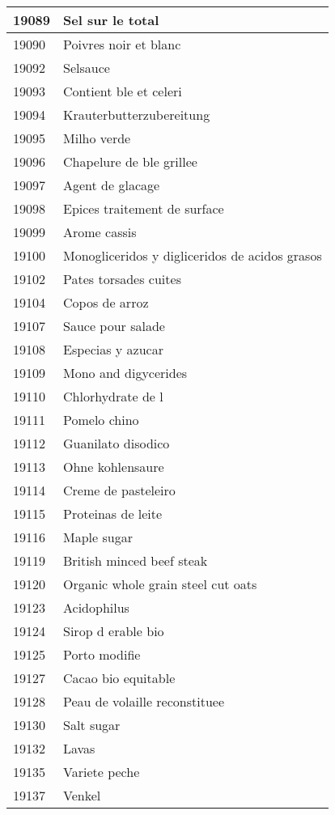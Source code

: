 \begin{longtable}{|l|l|}
19089 & Sel sur le total \\ \hline 
19090 & Poivres noir et blanc \\ \hline 
19092 & Selsauce \\ \hline 
19093 & Contient ble et celeri \\ \hline 
19094 & Krauterbutterzubereitung \\ \hline 
19095 & Milho verde \\ \hline 
19096 & Chapelure de ble grillee \\ \hline 
19097 & Agent de glacage \\ \hline 
19098 & Epices traitement de surface \\ \hline 
19099 & Arome cassis \\ \hline 
19100 & Monogliceridos y digliceridos de acidos grasos \\ \hline 
19102 & Pates torsades cuites \\ \hline 
19104 & Copos de arroz \\ \hline 
19107 & Sauce pour salade \\ \hline 
19108 & Especias y azucar \\ \hline 
19109 & Mono and digycerides \\ \hline 
19110 & Chlorhydrate de l \\ \hline 
19111 & Pomelo chino \\ \hline 
19112 & Guanilato disodico \\ \hline 
19113 & Ohne kohlensaure \\ \hline 
19114 & Creme de pasteleiro \\ \hline 
19115 & Proteinas de leite \\ \hline 
19116 & Maple sugar \\ \hline 
19119 & British minced beef steak \\ \hline 
19120 & Organic whole grain steel cut oats \\ \hline 
19123 & Acidophilus \\ \hline 
19124 & Sirop d erable bio \\ \hline 
19125 & Porto modifie \\ \hline 
19127 & Cacao bio equitable \\ \hline 
19128 & Peau de volaille reconstituee \\ \hline 
19130 & Salt sugar \\ \hline 
19132 & Lavas \\ \hline 
19135 & Variete peche \\ \hline 
19137 & Venkel \\ \hline 

\end{longtable}
